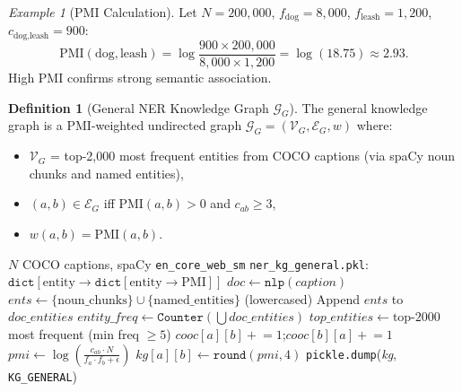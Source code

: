 \documentclass[12pt, a4paper]{article}
\theoremstyle{definition}
\newtheorem{definition}{Definition}[section]
\theoremstyle{plain}
\theoremstyle{remark}
\newtheorem{example}{Example}[section]
\newcommand{\KG}{\mathcal{G}}
\begin{document}
\begin{example}[PMI Calculation]
Let $N = 200{,}000$, $f_{\text{dog}} = 8{,}000$, $f_{\text{leash}} = 1{,}200$, $c_{\text{dog,leash}} = 900$:
\[
\text{PMI}(\text{dog}, \text{leash}) = \log\!\frac{900 \times 200{,}000}{8{,}000 \times 1{,}200} = \log(18.75) \approx 2.93.
\]
High PMI confirms strong semantic association.
\end{example}

\begin{definition}[General NER Knowledge Graph $\KG_G$]
The general knowledge graph is a PMI-weighted undirected graph $\KG_G = (\mathcal{V}_G, \mathcal{E}_G, w)$ where:
\begin{itemize}
  \item $\mathcal{V}_G$ = top-2,000 most frequent entities from COCO captions (via spaCy noun chunks and named entities),
  \item $(a,b) \in \mathcal{E}_G$ iff $\text{PMI}(a,b) > 0$ and $c_{ab} \geq 3$,
  \item $w(a,b) = \text{PMI}(a,b)$.
\end{itemize}
\end{definition}

\begin{algorithm}[H]
\caption{BUILD\_GENERAL\_NER\_KG}
\label{alg:kg_general}
\begin{algorithmic}[1]
\Require $N$ COCO captions, spaCy \texttt{en\_core\_web\_sm}
\Ensure \texttt{ner\_kg\_general.pkl}: $\texttt{dict}[\text{entity} \to \texttt{dict}[\text{entity} \to \text{PMI}]]$
  \State $\textit{doc} \gets \texttt{nlp}(\textit{caption})$
  \State $\textit{ents} \gets \{\text{noun\_chunks}\} \cup \{\text{named\_entities}\}$ (lowercased)
  \State Append $\textit{ents}$ to $\textit{doc\_entities}$
\EndFor
\State $\textit{entity\_freq} \gets \texttt{Counter}(\bigcup \textit{doc\_entities})$
\State $\textit{top\_entities} \gets \text{top-}2000$ most frequent (min freq $\geq 5$)
    \State $\textit{cooc}[a][b] \mathrel{+}= 1$;\quad $\textit{cooc}[b][a] \mathrel{+}= 1$
  \EndFor
\EndFor
{}
    \State $\textit{pmi} \gets \log\!\left(\frac{c_{ab} \cdot N}{f_a \cdot f_b + \epsilon}\right)$
      \State $\textit{kg}[a][b] \gets \texttt{round}(\textit{pmi}, 4)$
    \EndIf
  \EndFor
\EndFor
\State \texttt{pickle.dump}(\textit{kg}, \texttt{KG\_GENERAL})
\end{algorithmic}
\end{algorithm}
\end{document}
